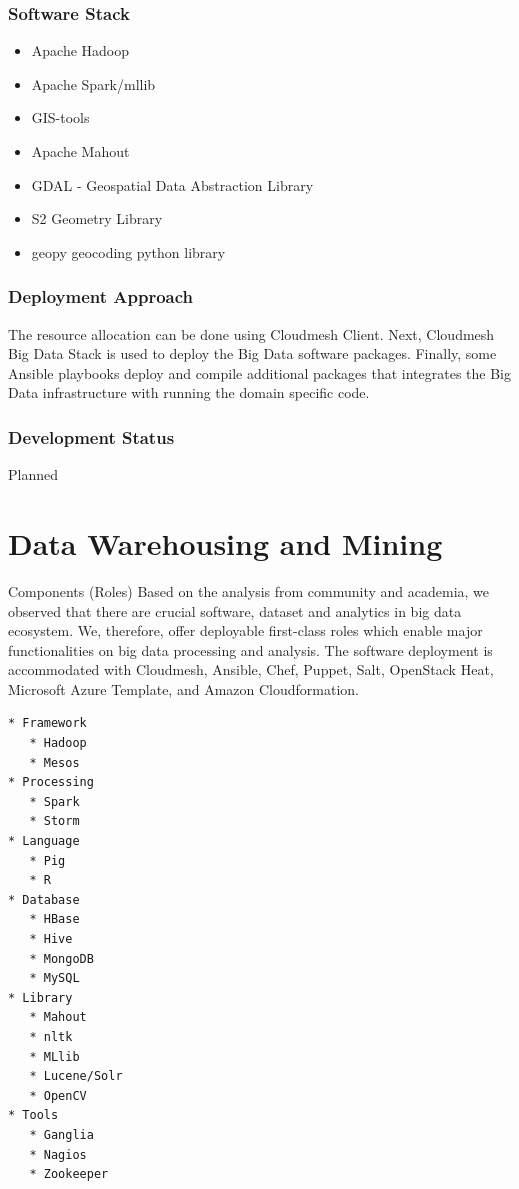 \documentclass[9pt,twocolumn,twoside]{styles/osajnl}
\begin{document}
\subsubsection{Software Stack}

\begin{itemize}
\item Apache Hadoop
\item Apache Spark/mllib
\item GIS-tools
\item Apache Mahout
\item GDAL - Geospatial Data Abstraction Library
\item S2 Geometry Library
\item geopy geocoding python library
\end{itemize}

\subsubsection{Deployment Approach}

The resource allocation can be done using Cloudmesh Client.  Next,
Cloudmesh Big Data Stack is used to deploy the Big Data software
packages.  Finally, some Ansible playbooks deploy and compile
additional packages that integrates the Big Data infrastructure with
running the domain specific code.

\subsubsection{Development Status}

Planned



\section{Data Warehousing and Mining}

Components (Roles)
Based on the analysis from community and academia, we observed that there are crucial software, dataset and analytics in big data ecosystem. We, therefore, offer deployable first-class roles which enable major functionalities on big data processing and analysis. The software deployment is accommodated with Cloudmesh, Ansible, Chef, Puppet, Salt, OpenStack Heat, Microsoft Azure Template, and Amazon Cloudformation.

\begin{verbatim}
* Framework
   * Hadoop
   * Mesos
* Processing
   * Spark
   * Storm
* Language
   * Pig
   * R
* Database
   * HBase
   * Hive
   * MongoDB
   * MySQL
* Library
   * Mahout
   * nltk
   * MLlib
   * Lucene/Solr
   * OpenCV
* Tools
   * Ganglia
   * Nagios
   * Zookeeper
\end{verbatim}
\end{document}
